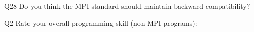 \begin{description}%
\item{Q28} Do you think the MPI standard should maintain backward compatibility?%
\item{Q2} Rate your overall programming skill (non-MPI programs):%
\end{description}%
